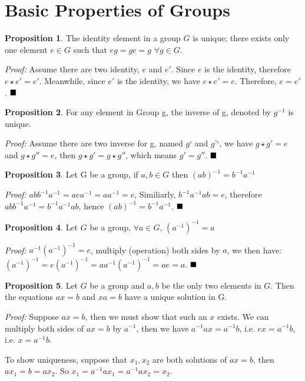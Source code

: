 \documentclass{article}
\theoremstyle{definition}
\newtheorem{prop}{Proposition}[subsection]
\begin{document}
\section{Basic Properties of Groups}

\begin{prop}
The identity element in a group $G$ is unique; there exists only one element $e \in G$ such that $eg = ge = g $ $\forall g \in G$.
\end{prop}
\textit{Proof:} Assume there are two identity, $e $ and $ e'$. Since $e$ is the identity, therefore $e\star e' = e'$. Meanwhile, since $e'$ is the identity, we have $e \star e' = e$. Therefore, $e = e'$. $\hfill\blacksquare$

\begin{prop}
For any element in Group g, the inverse of g, denoted by $g^{-1}$ is unique.
\end{prop}
\textit{Proof:} Assume there are two inverse for g, named $g‘$ and $g’‘$, we have $g \star g' = e$ and $g \star g'' = e$, then $g \star g' = g \star g''$, which means $g' = g''$. $\hfill\blacksquare$

\begin{prop}
Let G be a group, if $a, b \in G$ then $(ab)^{-1} = b^{-1}a^{-1}$
\end{prop}
\textit{Proof:} $abb^{-1}a^{-1} = aea^{-1} = aa^{-1} = e $, Similiarly, $b^{-1}a^{-1}ab = e$, therefore $abb^{-1}a^{-1} = b^{-1}a^{-1}ab $, hence $(ab)^{-1} = b^{-1}a^{-1}$. $\hfill\blacksquare$

\begin{prop}
Let $G$ be a group, $\forall a \in G$, $(a^{-1})^{-1}=a$
\end{prop}
\textit{Proof:} $a^{-1}(a^{-1})^{-1} = e$, multiply (operation) both sides by $a$, we then have: $(a^{-1})^{-1} = e(a^{-1})^{-1} = aa^{-1}(a^{-1})^{-1} = ae = a $. $\hfill\blacksquare$

\begin{prop}
Let $G$ be a group and $a, b$ be the only two elements in $G$. Then the equations $ax=b$ and $xa=b$ have a unique solution in G.
\end{prop}
\textit{Proof:} Suppose $ax=b$, then we must show that such an $x$ exists. We can multiply both sides of $ax=b$ by $a^{-1}$, then we have $a^{-1}ax = a^{-1}b$, i.e. $ex = a^{-1}b$, i.e. $x = a^{-1}b$.

To show uniqueness, suppose that $x_{1},x_{2}$ are both solutions of $ax=b$, then $ax_{1}=b=ax_{2}$. So $x_{1}=a^{-1}ax_{1} = a^{-1}ax_{2}=x_{2}$.
\end{document}
